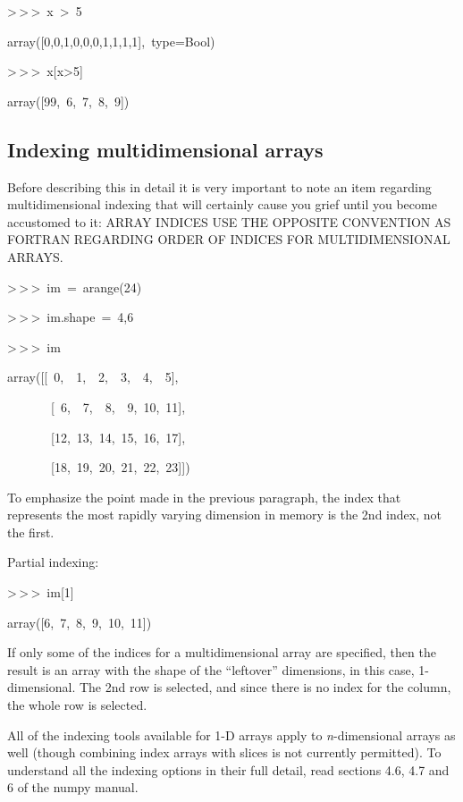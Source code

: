 \begin{lyxcode}
>\,{}>\,{}>~x~>~5

array({[}0,0,1,0,0,0,1,1,1,1],~type=Bool)

>\,{}>\,{}>~x{[}x>5]

array({[}99,~6,~7,~8,~9])
\end{lyxcode}

\subsection{Indexing multidimensional arrays}

Before describing this in detail it is very important to note an item
regarding multidimensional indexing that will certainly cause you
grief until you become accustomed to it: ARRAY INDICES USE THE OPPOSITE
CONVENTION AS FORTRAN REGARDING ORDER OF INDICES FOR MULTIDIMENSIONAL
ARRAYS.

\begin{lyxcode}
>\,{}>\,{}>~im~=~arange(24)

>\,{}>\,{}>~im.shape~=~4,6

>\,{}>\,{}>~im

array({[}{[}~0,~~1,~~2,~~3,~~4,~~5],

~~~~~~~{[}~6,~~7,~~8,~~9,~10,~11],

~~~~~~~{[}12,~13,~14,~15,~16,~17],

~~~~~~~{[}18,~19,~20,~21,~22,~23]])
\end{lyxcode}
To emphasize the point made in the previous paragraph, the index that
represents the most rapidly varying dimension in memory is the 2nd
index, not the first. 

Partial indexing:

\begin{lyxcode}
>\,{}>\,{}>~im{[}1]

array({[}6,~7,~8,~9,~10,~11])
\end{lyxcode}
If only some of the indices for a multidimensional array are specified,
then the result is an array with the shape of the {}``leftover''
dimensions, in this case, 1-dimensional. The 2nd row is selected,
and since there is no index for the column, the whole row is selected.

All of the indexing tools available for 1-D arrays apply to \emph{n}-dimensional
arrays as well (though combining index arrays with slices is not currently
permitted). To understand all the indexing options in their full detail,
read sections 4.6, 4.7 and 6 of the numpy manual.



